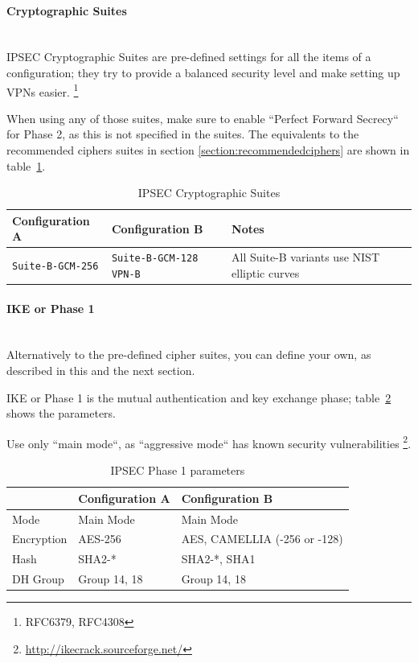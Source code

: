 \begin{description}
\paragraph*{Cryptographic Suites}\mbox{}\\

IPSEC Cryptographic Suites are pre-defined settings for all the items
of a configuration; they try to provide a balanced security level and
make setting up VPNs easier.
\footnote{RFC6379\cite{rfc6379}, RFC4308\cite{rfc4308}}

When using any of those suites, make sure to enable ``Perfect Forward
Secrecy`` for Phase 2, as this is not specified in the suites. The
equivalents to the recommended ciphers suites in section
\ref{section:recommendedciphers} are shown in
table~\ref{tab:IPSEC_suites}.

\begin{table}[h]
  \centering
  \small
  \begin{tabular}{p{2.5cm}p{2.5cm}l}
    \toprule
    Configuration A & Configuration B & Notes\\
    \midrule
    \verb|Suite-B-GCM-256| &
    \verb|Suite-B-GCM-128| \newline
    \verb|VPN-B| 
    & All Suite-B variants use NIST elliptic curves\\
    \bottomrule
  \end{tabular}
  \caption{IPSEC Cryptographic Suites}
  \label{tab:IPSEC_suites}
\end{table}

\paragraph*{IKE or Phase 1}\mbox{}\\

Alternatively to the pre-defined cipher suites, you can define your
own, as described in this and the next section.

IKE or Phase 1 is the mutual authentication and key exchange phase;
table~\ref{tab:IPSEC_ph1_params} shows the parameters.

Use only ``main mode``, as ``aggressive mode`` has known security
vulnerabilities \footnote{\url{http://ikecrack.sourceforge.net/}}.

\begin{table}[h]
  \centering
  \small
  \begin{tabular}{lll}
    \toprule
    & Configuration A & Configuration B \\
    \midrule
    Mode & Main Mode & Main Mode \\
    Encryption & AES-256 & AES, CAMELLIA (-256 or -128) \\
    Hash & SHA2-* & SHA2-*, SHA1 \\
    DH Group & Group 14, 18 & Group 14, 18 \\
    \bottomrule
  \end{tabular}
  \caption{IPSEC Phase 1 parameters}
  \label{tab:IPSEC_ph1_params}
\end{table}


\end{description}

